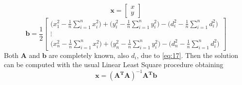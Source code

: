 \documentclass[12pt,twoside]{report}
\begin{document}
$$
\mathbf{x}=\begin{bmatrix}
    x\\
    y
\end{bmatrix}
$$
$$\mathbf{b}=\frac{1}{2}
\begin{bmatrix}
\bigg(x_1^2-\frac{1}{n}\sum_{i=1}^nx^2_i\bigg)+\bigg(y_i^2-\frac{1}{n}\sum_{i=1}^ny^2_i\bigg)-\bigg(d_i^2-\frac{1}{n}\sum_{i=1}^nd_i^2\bigg)\\
\vdots\\
\bigg(x_n^2-\frac{1}{n}\sum_{i=1}^nx^2_i\bigg)+\bigg(y_n^2-\frac{1}{n}\sum_{i=1}^ny^2_i\bigg)-\bigg(d_n^2-\frac{1}{n}\sum_{i=1}^nd_i^2\bigg)
\end{bmatrix}
$$
Both $\mathbf{A}$ and $\mathbf{b}$ are completely known, also $d_i$, due to \ref{eq:17}. Then the solution can be computed with the usual Linear Least Square procedure obtaining
\begin{equation}
    \mathbf{x}=(\mathbf{A^TA})^{-1}\mathbf{A^Tb}
\end{equation}
\clearpage
\end{document}
